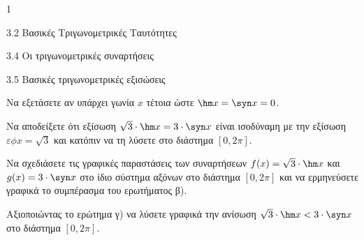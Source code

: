 \begin{ylh}{1}
\item 3.2 Βασικές Τριγωνομετρικές Ταυτότητες
\item 3.4 Οι τριγωνομετρικές συναρτήσεις
\item 3.5 Βασικές τριγωνομετρικές εξισώσεις
\end{ylh}
\begin{alist}
\item Να εξετάσετε αν υπάρχει γωνία $x$ τέτοια ώστε $\hm  x = \syn  x = 0$.
\item Να αποδείξετε ότι εξίσωση $\sqrt{3} \cdot \hm  x = 3 \cdot \syn  x$ είναι ισοδύναμη με την εξίσωση $\varepsilon\phi x = \sqrt{3}$ και κατόπιν να τη λύσετε στο διάστημα $[0, 2\pi]$.
\item Να σχεδιάσετε τις γραφικές παραστάσεις των συναρτήσεων $f(x) = \sqrt{3} \cdot \hm  x$ και $g(x) = 3 \cdot \syn  x$ στο ίδιο σύστημα αξόνων στο διάστημα $[0, 2\pi]$ και να ερμηνεύσετε γραφικά το συμπέρασμα του ερωτήματος β).
\item Αξιοποιώντας το ερώτημα γ) να λύσετε γραφικά την ανίσωση $\sqrt{3} \cdot \hm  x < 3 \cdot \syn  x$ στο διάστημα $[0, 2\pi]$.
\end{alist}


